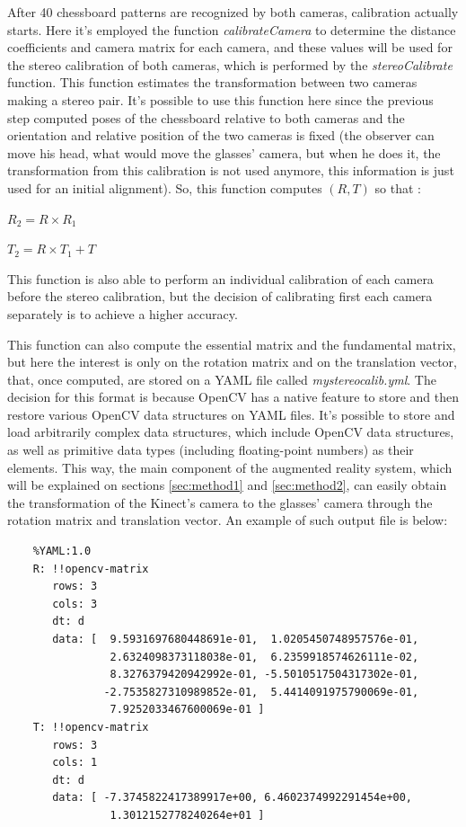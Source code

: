 \documentclass[msc, a4paper, classic, en]{ufbathesis}
\begin{document}
After 40 chessboard patterns are recognized by both cameras, calibration actually starts. Here it's employed the function \textit{calibrateCamera} to determine the distance coefficients and camera matrix for each camera, and these values will be used for the stereo calibration of both cameras, which is performed by the \textit{stereoCalibrate} function. This function estimates the transformation between two cameras making a stereo pair. It's possible to use this function here since the previous step computed poses of the chessboard relative to both cameras and the orientation and relative position of the two cameras is fixed (the observer can move his head, what would move the glasses' camera, but when he does it, the transformation from this calibration is not used anymore, this information is just used for an initial alignment). So, this function computes $(R, T)$ so that \cite{opencvsc}:

\begin{center}
$R_2 = R \times R_1$
\end{center}

\begin{center}
$T_2= R \times T_1 + T$
\end{center}

This function is also able to perform an individual calibration of each camera before the stereo calibration, but the decision of calibrating first each camera separately is to achieve a higher accuracy.

This function can also compute the essential matrix and the fundamental matrix, but here the interest is only on the rotation matrix and on the translation vector, that, once computed, are stored on a YAML \cite{yaml} file called \textit{mystereocalib.yml}. The decision for this format is because OpenCV has a native feature to store and then restore various OpenCV data structures on YAML files. It's possible to store and load arbitrarily complex data structures, which include OpenCV data structures, as well as primitive data types (including floating-point numbers) as their elements. This way, the main component of the augmented reality system, which will be explained on sections \ref{sec:method1} and \ref{sec:method2}, can easily obtain the transformation of the Kinect's camera to the glasses' camera through the rotation matrix and translation vector. An example of such output file is below:

\begin{verbatim}
    %YAML:1.0
    R: !!opencv-matrix
       rows: 3
       cols: 3
       dt: d
       data: [  9.5931697680448691e-01,  1.0205450748957576e-01,
                2.6324098373118038e-01,  6.2359918574626111e-02,
                8.3276379420942992e-01, -5.5010517504317302e-01,
               -2.7535827310989852e-01,  5.4414091975790069e-01,
                7.9252033467600069e-01 ]
    T: !!opencv-matrix
       rows: 3
       cols: 1
       dt: d
       data: [ -7.3745822417389917e+00, 6.4602374992291454e+00,
                1.3012152778240264e+01 ]
\end{verbatim}
\end{document}
